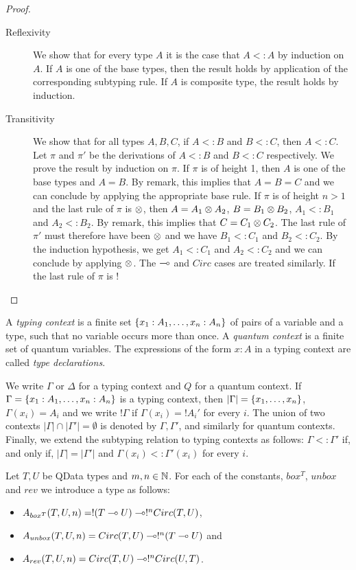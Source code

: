 \documentclass{article}
\begin{document}
\begin{proof}~
\begin{description}
  \item[Reflexivity] We show that for every type $A$ it is the case 
  that $A<:A$ by induction on $A$. If $A$ is one of the base types, 
  then the result holds by application of the corresponding subtyping
  rule. If $A$ is composite type, the result holds by induction.
  \item[Transitivity] We show that for all types $A,B,C$, if $A<:B$ 
  and $B<:C$, then $A<:C$. Let $\pi$ and $\pi'$ be the derivations of
  $A<:B$ and $B<:C$ respectively. We prove the result by induction on 
  $\pi$. If $\pi$ is of height 1, then $A$ is one of the base types 
  and $A=B$. By remark, this implies that $A=B=C$ and we can 
  conclude by applying the appropriate base rule. If $\pi$ is of 
  height $n>1$ and the last rule of $\pi$ is $\otimes$, then $A=A_1\otimes A_2$,
  $B=B_1\otimes B_2$, $A_1<: B_1$ and $A_2<: B_2$. By remark, this implies 
  that $C=C_1\otimes C_2$. The last rule of $\pi'$ must therefore have been 
  $\otimes$ and we have $B_1<: C_1$ and $B_2 <: C_2$. By the induction 
  hypothesis, we get $A_1<: C_1$ and $A_2<: C_2$ and we can conclude 
  by applying $\otimes$. The $\multimap$ and $Circ$ cases are treated similarly. 
  If the last rule of $\pi$ is $!$
\end{description}
\end{proof}

\begin{definition}
A \emph{typing context} is a finite set $\{x_1:A_1,\ldots,x_n:A_n\}$ of 
pairs of a variable and a type, such that no variable occurs more than 
once. A \emph{quantum context} is a finite set of quantum variables.
The expressions of the form $x:A$ in a typing context are called 
\emph{type declarations}.	
\end{definition}

We write $\Gamma$ or $\Delta$ for a typing context and $Q$ for a quantum 
context. If $\Gamma =\{x_1:A_1,\ldots,x_n:A_n\}$ is a typing context, then 
$|\Gamma|=\{x_1,\ldots,x_n\}$, $\Gamma (x_i)=A_i$ and we write $!\Gamma$ 
if $\Gamma(x_i)=!A_i'$ for every $i$. The union of two contexts 
$|\Gamma|\cap  |\Gamma'|=\emptyset$ is denoted by $\Gamma,\Gamma'$, and 
similarly for quantum contexts. Finally, we extend the subtyping relation 
to typing contexts as follows: $\Gamma <: \Gamma'$ if, and only if, 
$|\Gamma | = |\Gamma'|$ and $\Gamma (x_i)<: \Gamma' (x_i)$ for every 
$i$.

\begin{definition}
Let $T,U$ be QData types and $m,n\in\mathbb{N}$. For each of the constants, $box^T$, 
$unbox$ and $rev$ we introduce a type as follows:
\begin{itemize}
  \item $A_{box^T}(T,U,n)=!(T\multimap U)\multimap !^nCirc(T,U)$,
  \item $A_{unbox}(T,U,n)=Circ(T,U)\multimap !^n(T\multimap U)$ and
  \item $A_{rev}(T,U,n)=Circ(T,U) \multimap !^nCirc(U,T)$.
\end{itemize}
\end{definition}
\end{document}
